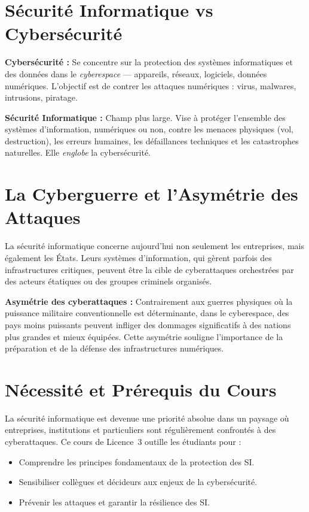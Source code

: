 \section*{Sécurité Informatique vs Cybersécurité}

\begin{boxdef}
\textbf{Cybersécurité :} Se concentre sur la protection des systèmes informatiques et des données dans le \textit{cyberespace} — appareils, réseaux, logiciels, données numériques. L'objectif est de contrer les attaques numériques : virus, malwares, intrusions, piratage.

\textbf{Sécurité Informatique :} Champ plus large. Vise à protéger l'ensemble des systèmes d'information, numériques ou non, contre les menaces physiques (vol, destruction), les erreurs humaines, les défaillances techniques et les catastrophes naturelles. Elle \emph{englobe} la cybersécurité.
\end{boxdef}

\section*{La Cyberguerre et l'Asymétrie des Attaques}

La sécurité informatique concerne aujourd'hui non seulement les entreprises, mais également les États. Leurs systèmes d'information, qui gèrent parfois des infrastructures critiques, peuvent être la cible de cyberattaques orchestrées par des acteurs étatiques ou des groupes criminels organisés.

\begin{boxalert}
\textbf{Asymétrie des cyberattaques :} Contrairement aux guerres physiques où la puissance militaire conventionnelle est déterminante, dans le cyberespace, des pays moins puissants peuvent infliger des dommages significatifs à des nations plus grandes et mieux équipées. Cette asymétrie souligne l'importance de la préparation et de la défense des infrastructures numériques.
\end{boxalert}

\section*{Nécessité et Prérequis du Cours}

La sécurité informatique est devenue une priorité absolue dans un paysage où entreprises, institutions et particuliers sont régulièrement confrontés à des cyberattaques. Ce cours de Licence~3 outille les étudiants pour :
\begin{itemize}
    \item Comprendre les principes fondamentaux de la protection des SI.
    \item Sensibiliser collègues et décideurs aux enjeux de la cybersécurité.
    \item Prévenir les attaques et garantir la résilience des SI.
\end{itemize}

